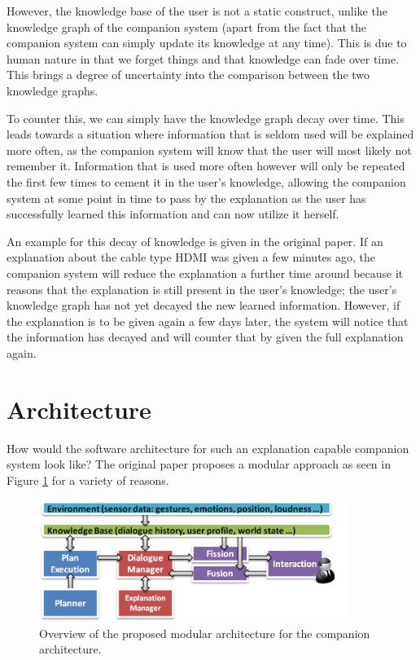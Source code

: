 \documentclass[a4paper]{article}
\begin{document}
However, the knowledge base of the user is not a static construct, unlike the knowledge graph of the companion system (apart from the fact that the companion system can simply update its knowledge at any time). This is due to human nature in that we forget things and that knowledge can fade over time. This brings a degree of uncertainty into the comparison between the two knowledge graphs.

To counter this, we can simply have the knowledge graph decay over time. This leads towards a situation where information that is seldom used will be explained more often, as the companion system will know that the user will most likely not remember it. Information that is used more often however will only be repeated the first few times to cement it in the user's knowledge, allowing the companion system at some point in time to pass by the explanation as the user has successfully learned this information and can now utilize it herself.

An example for this decay of knowledge is given in the original paper. If an explanation about the cable type HDMI was given a few minutes ago, the companion system will reduce the explanation a further time around because it reasons that the explanation is still present in the user's knowledge; the user's knowledge graph has not yet decayed the new learned information. However, if the explanation is to be given again a few days later, the system will notice that the information has decayed and will counter that by given the full explanation again.

\section{Architecture}

How would the software architecture for such an explanation capable companion system look like? The original paper proposes a modular approach as seen in Figure \ref{fig:architecture} for a variety of reasons.

\begin{figure}[H]
	\centering
	\includegraphics[width=10cm]{arch.png}
	\caption{Overview of the proposed modular architecture for the companion architecture.}
	\label{fig:architecture}
\end{figure}
\end{document}
